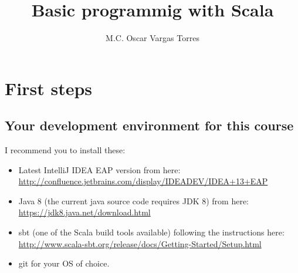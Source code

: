 \documentclass[fontsize=16pt, parskipp=full, paper=legal]{scrbook}
\title{Basic programmig with Scala}
\author{M.C. Oscar Vargas Torres}
\begin{document}
\maketitle

\chapter{First steps}

\section{Your development environment for this course}
I recommend you to install these:
\begin{itemize}
\item Latest IntelliJ IDEA EAP version from here:\\
 \url{http://confluence.jetbrains.com/display/IDEADEV/IDEA+13+EAP}
\item Java 8 (the current java source code requires JDK 8) from here:\\
 \url{https://jdk8.java.net/download.html}
\item sbt (one of the Scala build tools available) following the
  instructions here:\\
 \url{http://www.scala-sbt.org/release/docs/Getting-Started/Setup.html}
\item git for your OS of choice.
\end{itemize}
\end{document}
